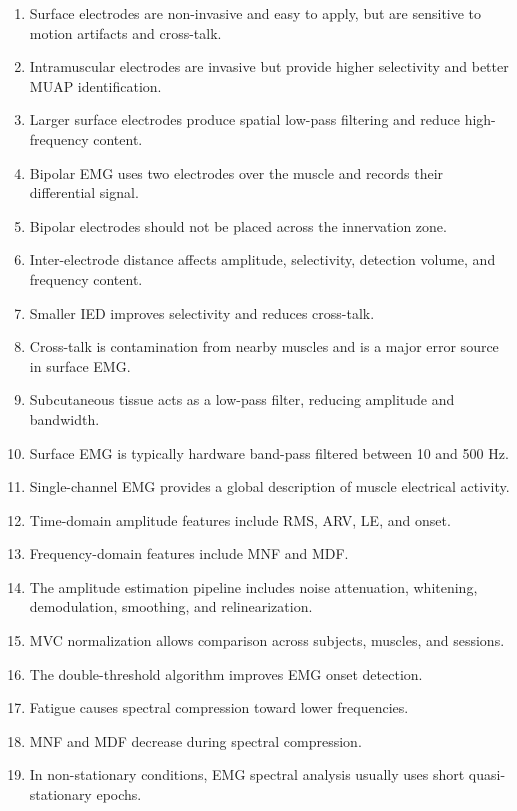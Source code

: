 \begin{enumerate}
    \item Surface electrodes are non-invasive and easy to apply, but are sensitive to motion artifacts and cross-talk.
    \item Intramuscular electrodes are invasive but provide higher selectivity and better MUAP identification.
    \item Larger surface electrodes produce spatial low-pass filtering and reduce high-frequency content.
    \item Bipolar EMG uses two electrodes over the muscle and records their differential signal.
    \item Bipolar electrodes should not be placed across the innervation zone.
    \item Inter-electrode distance affects amplitude, selectivity, detection volume, and frequency content.
    \item Smaller IED improves selectivity and reduces cross-talk.
    \item Cross-talk is contamination from nearby muscles and is a major error source in surface EMG.
    \item Subcutaneous tissue acts as a low-pass filter, reducing amplitude and bandwidth.
    \item Surface EMG is typically hardware band-pass filtered between 10 and 500 Hz.
    \item Single-channel EMG provides a global description of muscle electrical activity.
    \item Time-domain amplitude features include RMS, ARV, LE, and onset.
    \item Frequency-domain features include MNF and MDF.
    \item The amplitude estimation pipeline includes noise attenuation, whitening, demodulation, smoothing, and relinearization.
    \item MVC normalization allows comparison across subjects, muscles, and sessions.
    \item The double-threshold algorithm improves EMG onset detection.
    \item Fatigue causes spectral compression toward lower frequencies.
    \item MNF and MDF decrease during spectral compression.
    \item In non-stationary conditions, EMG spectral analysis usually uses short quasi-stationary epochs.
\end{enumerate}

